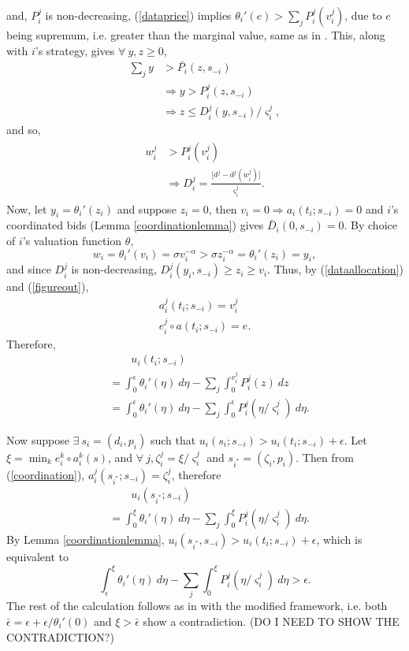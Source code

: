 \documentclass[12pt]{article}
\theoremstyle{definition}
\newcommand{\vs}{\varsigma}
\begin{document}
\begin{multicols}{2}
and, $P_i^j$ is non-decreasing, (\ref{dataprice}) implies
$\theta_i'(e) >\sum_j P_i^j(v_i^j)$, due to $e$ being supremum, i.e.
greater than the marginal value, same as in \cite{semret}. This,
along with $i$'s strategy, gives $\forall \ y,z \ge 0$,
\begin{align*}
    \displaystyle\sum_{j} y &> \bar{P_i}(z,s_{-i}) \\
    &\Rightarrow y > P_i^j(z,s_{-i})\\
    &\Rightarrow
    z \le D_i^j(y,s_{-i})/\vs_i^j,
\end{align*}
and so,
\begin{align}\label{figureout}
\begin{split}
    w_i^j & > {P}_i^j(v_i^j) \\
    &\Rightarrow {D}_i^j = \frac{\lbrack d^j - d^j(w_i^j)\rbrack}{\vs_i^j}.
\end{split}
\end{align}
Now, let $y_i = {\theta_i}'(z_i)$ and suppose $z_i = 0$, then $v_i=0 \Rightarrow
a_i(t_i; s_{-i})=0$ and $i$'s coordinated bids (Lemma \ref{coordinationlemma})
gives $\bar{D}_i(0,s_{-i}) =0$. 
By choice of $i$'s valuation function $\theta$,
$$
w_i = {\theta_i}'(v_i) =\sigma v_i^{-\alpha} >  \sigma
z_i^{-\alpha} = {\theta_i}'(z_i) = y_i,
$$
and since $D_i^j$ is non-decreasing, $D_i^j(y_i,s_{-i}) \ge z_i \ge v_i$.
Thus, by (\ref{dataallocation}) and (\ref{figureout}),
\begin{align*}
    a_i^j(t_i; s_{-i}) = v_i^j \\
    e_i^j \circ a(t_i;s_{-i}) = e.
\end{align*}
Therefore,
\begin{align*}
    &\qquad u_i(t_i;s_{-i}) \\
    &= \displaystyle\int_0^\epsilon {\theta_i}'(\eta) \ d\eta -
\sum_j \int_0^{v_i^j} P_i^j(z) \ dz \\
    &= \int_0^\epsilon {\theta_i}'(\eta) \ d\eta - \sum_j\int_0^\epsilon
P_i^j(\eta/\vs_i^j) \ d\eta.
\end{align*}

Now suppose $\exists \ s_i = (d_i, p_i)$ such that $u_i(s_i;s_{-i}) > u_i(t_i;
s_{-i}) + \epsilon$. Let $\xi = \min_k e_i^k\circ a_i^k(s)$, and $\forall \ j,
\zeta_i^j = \xi/\vs_i^j$ and $s_{i^*} = (\zeta_i,p_i)$. Then from
(\ref{coordination}), $a_i^j(s_{i^*}; s_{-i}) = \zeta_i^j$, therefore
\begin{align*}
    &\qquad u_i(s_{i^*};s_{-i}) \\
    &= \displaystyle\int_0^\xi {\theta_i}'(\eta)\ d\eta -\sum_j\int_0^\xi P_i^j(\eta/\vs_i^j) \ d\eta.
\end{align*}
By Lemma \ref{coordinationlemma}, $u_i(s_{i^*}, s_{-i}) > u_i(t_i; s_{-i}) +
\epsilon$, which is equivalent to 
$$
    \int_\epsilon^\xi {\theta_i}'(\eta) \ d\eta - \sum_j\int_0^\xi
P_i^j(\eta/\vs_i^j) \ d\eta > \epsilon.
$$
The rest of the calculation follows as in \cite{semret} with the modified
framework, i.e. both $\bar\epsilon = \epsilon + \epsilon/{\theta_i}'(0)$ and
$\xi > \bar\epsilon$ show a contradiction.
(DO I NEED TO SHOW THE CONTRADICTION?)


\end{multicols}
\end{document}
